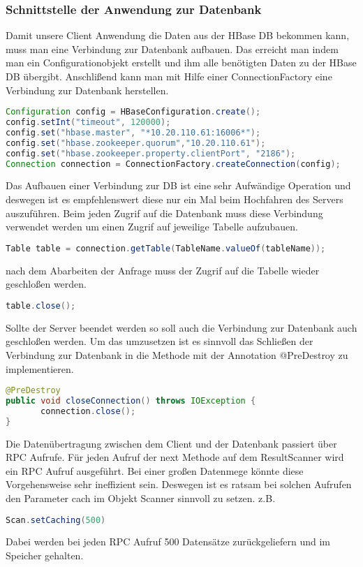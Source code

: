 \subsubsection{Schnittstelle der Anwendung zur Datenbank}

Damit unsere Client Anwendung die Daten aus der HBase DB bekommen kann, muss man eine Verbindung zur Datenbank aufbauen.
Das erreicht man indem man ein Configurationobjekt  erstellt und ihm alle benötigten Daten zu der HBase DB übergibt. Anschlißend kann man mit Hilfe einer ConnectionFactory eine Verbindung zur Datenbank herstellen.

\begin{lstlisting}[language=Java]
Configuration config = HBaseConfiguration.create();
config.setInt("timeout", 120000);
config.set("hbase.master", "*10.20.110.61:16006*");
config.set("hbase.zookeeper.quorum","10.20.110.61");
config.set("hbase.zookeeper.property.clientPort", "2186");
Connection connection = ConnectionFactory.createConnection(config);
\end{lstlisting}

Das Aufbauen einer Verbindung zur DB ist eine sehr Aufwändige Operation und deswegen ist es empfehlenswert diese nur ein Mal beim Hochfahren des Servers auszuführen.
Beim jeden Zugrif auf die Datenbank muss diese Verbindung verwendet werden um einen Zugrif auf jeweilige Tabelle aufzubauen.

\begin{lstlisting}[language=Java]
Table table = connection.getTable(TableName.valueOf(tableName));
\end{lstlisting}

nach dem Abarbeiten der Anfrage muss der Zugrif auf die Tabelle wieder geschloßen werden.
\begin{lstlisting}[language=Java]
table.close();
\end{lstlisting}

Sollte der Server beendet werden so soll auch die Verbindung zur Datenbank auch geschloßen werden.
Um das umzusetzen ist es sinnvoll das Schließen der Verbindung zur Datenbank in die Methode mit der Annotation     @PreDestroy zu implementieren.

\begin{lstlisting}[language=Java]
@PreDestroy
public void closeConnection() throws IOException {
       connection.close();
}
\end{lstlisting}

Die Datenübertragung zwischen dem Client und der Datenbank passiert über RPC Aufrufe. Für jeden Aufruf der next Methode auf dem ResultScanner wird ein RPC Aufruf ausgeführt. Bei einer großen Datenmege könnte diese Vorgehensweise sehr ineffizient sein. Deswegen ist es ratsam bei solchen Aufrufen den Parameter cach im Objekt Scanner sinnvoll zu setzen.
z.B.
\begin{lstlisting}[language=Java]
Scan.setCaching(500)
\end{lstlisting}
Dabei werden bei jeden RPC Aufruf 500 Datensätze zurückgeliefern und im Speicher gehalten.


